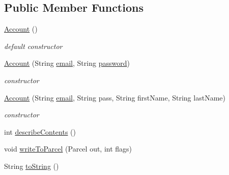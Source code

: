 \subsection*{Public Member Functions}
\begin{DoxyCompactItemize}
\item 
\hyperlink{classuk_1_1ac_1_1swan_1_1digitaltrails_1_1components_1_1_account_a2bb28b85523b20bfc58c7357309f40e0}{Account} ()
\begin{DoxyCompactList}\small\item\em default constructor \end{DoxyCompactList}\item 
\hyperlink{classuk_1_1ac_1_1swan_1_1digitaltrails_1_1components_1_1_account_a42a177fbe988980baab3eecb4a1b74cc}{Account} (String \hyperlink{classuk_1_1ac_1_1swan_1_1digitaltrails_1_1components_1_1_account_abd57b618dc4da21e752c066057b4d58a}{email}, String \hyperlink{classuk_1_1ac_1_1swan_1_1digitaltrails_1_1components_1_1_account_a7a421a5b7ed69b2841fc0054e807f01f}{password})
\begin{DoxyCompactList}\small\item\em constructor \end{DoxyCompactList}\item 
\hyperlink{classuk_1_1ac_1_1swan_1_1digitaltrails_1_1components_1_1_account_ab77c868f150571d56f11ec90b9860f0e}{Account} (String \hyperlink{classuk_1_1ac_1_1swan_1_1digitaltrails_1_1components_1_1_account_abd57b618dc4da21e752c066057b4d58a}{email}, String pass, String first\+Name, String last\+Name)
\begin{DoxyCompactList}\small\item\em constructor \end{DoxyCompactList}\item 
int \hyperlink{classuk_1_1ac_1_1swan_1_1digitaltrails_1_1components_1_1_account_af5fd9d7ab8392f01b7220dcf1a431e77}{describe\+Contents} ()
\item 
void \hyperlink{classuk_1_1ac_1_1swan_1_1digitaltrails_1_1components_1_1_account_aebcfc94a0fca6f7bf11f0e154c240054}{write\+To\+Parcel} (Parcel out, int flags)
\item 
String \hyperlink{classuk_1_1ac_1_1swan_1_1digitaltrails_1_1components_1_1_account_a830add867df07a50538ee11994108c8d}{to\+String} ()
\end{DoxyCompactItemize}
